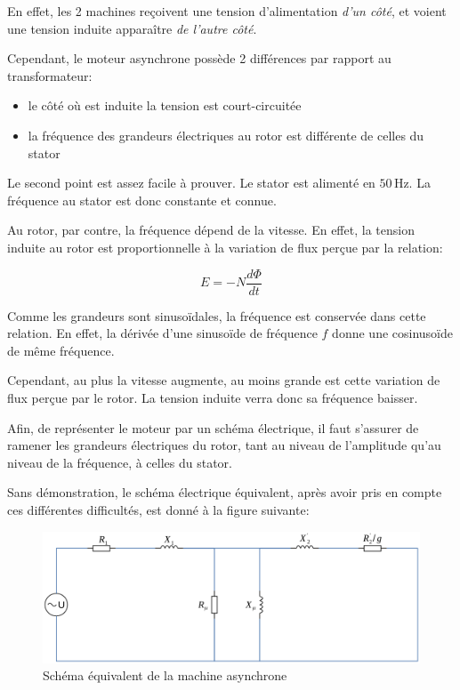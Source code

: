 \documentclass[11pt]{article}
\providecommand{\tightlist}{%
      \setlength{\itemsep}{0pt}\setlength{\parskip}{0pt}}
\begin{document}
    En effet, les 2 machines reçoivent une tension d'alimentation \emph{d'un
côté}, et voient une tension induite apparaître \emph{de l'autre côté}.

    Cependant, le moteur asynchrone possède 2 différences par rapport au
transformateur:

\begin{itemize}
\tightlist
\item
  le côté où est induite la tension est court-circuitée
\item
  la fréquence des grandeurs électriques au rotor est différente de
  celles du stator
\end{itemize}

    Le second point est assez facile à prouver. Le stator est alimenté en
\(50\, \mathrm{Hz}\). La fréquence au stator est donc constante et
connue.

    Au rotor, par contre, la fréquence dépend de la vitesse. En effet, la
tension induite au rotor est proportionnelle à la variation de flux
perçue par la relation:

\[ E = -N \frac{d\Phi}{dt} \]

    Comme les grandeurs sont sinusoïdales, la fréquence est conservée dans
cette relation. En effet, la dérivée d'une sinusoïde de fréquence \(f\)
donne une cosinusoïde de même fréquence.

    Cependant, au plus la vitesse augmente, au moins grande est cette
variation de flux perçue par le rotor. La tension induite verra donc sa
fréquence baisser.

    Afin, de représenter le moteur par un schéma électrique, il faut
s'assurer de ramener les grandeurs électriques du rotor, tant au niveau
de l'amplitude qu'au niveau de la fréquence, à celles du stator.

    Sans démonstration, le schéma électrique équivalent, après avoir pris en
compte ces différentes difficultés, est donné à la figure suivante:

    \begin{figure}[!hbt]
        \centering
        \includegraphics{Images/MAS/schema_equivalent_mas.png}
        \caption{Schéma équivalent de la machine asynchrone}
    \end{figure}
\end{document}
